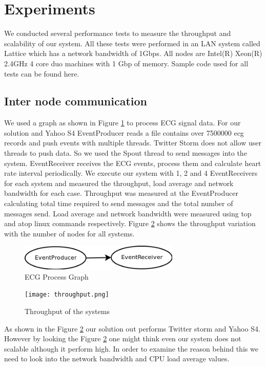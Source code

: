 \section{Experiments}

We conducted several performance tests to measure the throughput and scalability of our system. All these tests were performed in an LAN system called Lattice which has a network bandwidth of 1Gbps. All nodes are Intel(R) Xeon(R) 2.4GHz 4 core duo machines with 1 Gbp of memory. Sample code used for all tests can be found here\cite{solutionCode}.


\subsection{Inter node communication}
We used a graph as shown in Figure \ref{ecgGraph} to process ECG signal data. For our solution and Yahoo S4\cite{neumeyer2010s4} EventProducer reads a file contains over 7500000 ecg records and push events with multiple threads. Twitter Storm\cite{twitterStorm} does not allow user threads to push data. So we used the Spout thread to send messages into the system. EventReceiver  receives the ECG events, process them and calculate heart rate interval periodically.  
We execute our system with 1, 2 and 4  EventReceivers for each system and measured the throughput, load average and network bandwidth  for each case. Throughput was measured at the EventProducer calculating total time required to send messages and the total number of messages send. Load average and network bandwidth were measured using top and atop linux commands respectively. Figure \ref{throuput} shows the throughput variation with the number of nodes for all systems. 

\begin{figure}[!t]
        \centering
        \includegraphics[width=3.0in]{ecgGraph.png}
        \caption{ECG Process Graph}
        \label{ecgGraph}
\end{figure}
\begin{figure}[!t]
        \centering
        \texttt{[image: throughput.png]}
        \caption{Throughput of the systems}
        \label{throuput}
\end{figure}

As shown in the Figure \ref{throuput} our solution out performs Twitter storm\cite{twitterStorm} and Yahoo S4\cite{neumeyer2010s4}. However by looking the Figure \ref{throuput} one might think even our system does not scalable although it perform high. In order to examine the reason behind this we need to look into the network bandwidth and CPU load average values. 
 
